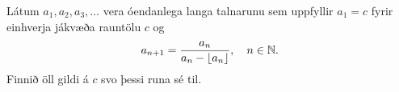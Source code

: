 Látum $a_1,a_2,a_3,\ldots$ vera óendanlega langa talnarunu sem uppfyllir $a_1=c$ fyrir einhverja jákvæða rauntölu $c$ og
\[
a_{n+1}=\frac{a_n}{a_n-\left\lfloor a_n \right\rfloor}, \quad n \in \mbox{${\mathbb N}$}.
\]
Finnið öll gildi á $c$ svo þessi runa sé til.
